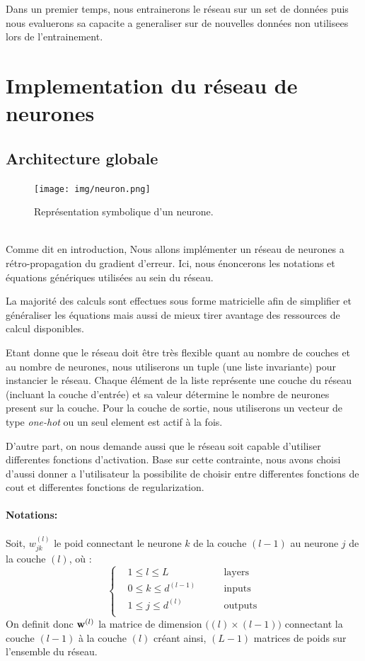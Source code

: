 \documentclass[11pt]{article}
\begin{document}
Dans un premier temps, nous entrainerons le r\'eseau sur un set de donn\'ees puis
nous evaluerons sa capacite a generaliser sur de nouvelles donn\'ees non utilisees
lors de l'entrainement.

\section{Implementation du r\'eseau de neurones}
\subsection{Architecture globale}
\begin{figure}[htp]
	\centering
	\texttt{[image: img/neuron.png]}
	\caption{Repr\'esentation symbolique d'un neurone.}
\end{figure} \\

Comme dit en introduction, Nous allons impl\'ementer un r\'eseau de neurones a
r\'etro-propagation du gradient d'erreur. Ici, nous \'enoncerons les notations et
\'equations g\'en\'eriques utilis\'ees au sein du r\'eseau.

La majorit\'e des calculs sont effectues sous forme matricielle afin de simplifier
et g\'en\'eraliser les \'equations mais aussi de mieux tirer avantage des ressources
de calcul disponibles.

Etant donne que le r\'eseau doit \^etre tr\`es flexible quant au nombre de
couches et au nombre de neurones, nous utiliserons un tuple (une liste
invariante) pour instancier le r\'eseau.
Chaque \'el\'ement de la liste repr\'esente une couche du r\'eseau
(incluant la couche d'entr\'ee) et sa valeur d\'etermine le nombre de neurones
present sur la couche.
Pour la couche de sortie, nous utiliserons un vecteur de
type \emph{one-hot} ou un seul element est actif \`a la fois.

D'autre part, on nous demande aussi que le r\'eseau soit capable d'utiliser
differentes fonctions d'activation. Base sur cette contrainte, nous avons
choisi d'aussi donner a l'utilisateur la possibilite de choisir entre
differentes fonctions de cout et differentes fonctions de regularization.

\paragraph{Notations: }Soit, $w_{jk}^{(l)}$ le poid connectant le neurone $k$
de la couche $(l-1)$ au neurone $j$ de la couche $(l)$, o\`u :
$$
\left \{
	\begin{aligned}
		&1 \le l \le L         &\qquad \text{layers} \\
		&0 \le k \le d^{(l-1)} &\qquad \text{inputs} \\
		&1 \le j \le d^{(l)}   &\qquad \text{outputs}\\
	\end{aligned}
\right .
$$
On definit donc ${\bf w}^{(l)}$ la matrice de dimension $\Big((l) \times (l-1)\Big)$
connectant la couche $(l-1)$ \`a la couche $(l)$ cr\'eant ainsi, $(L-1)$ matrices
de poids sur l'ensemble du r\'eseau. \\
\end{document}
